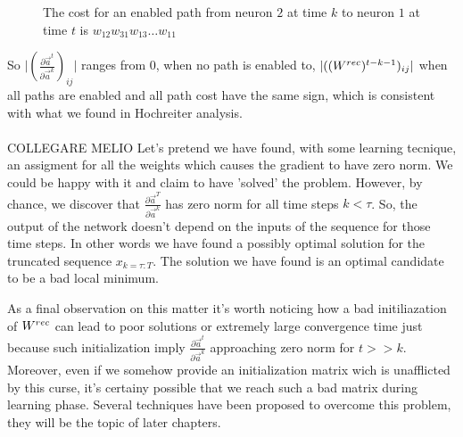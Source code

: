 \begin{figure}
\caption{The cost for an enabled path from neuron $2$ at time $k$ to neuron $1$ at time $t$ is $w_{12}w_{31}w_{13}\hdots w_{11}$ }
\label{gradient_path_cost_relu}
\end{figure}

So $\vert (\frac{\partial \vec{a}^t}{\partial \vec{a}^k})_{ij}\vert$ ranges from 0, when no path is enabled to, $\vert ((W^{rec})^{t-k-1})_{ij} \vert$ when all
paths are enabled and all path cost have the same sign, which is consistent with what we found in Hochreiter analysis.
\\\\
COLLEGARE MELIO
Let's pretend we have found, with some learning tecnique, an assigment for all the weights which causes the gradient to have zero norm. We could be happy with
it and claim to have 'solved' the problem. However, by chance, we discover that $\frac{\partial \vec{a}^T}{\partial \vec{a}^k}$ has zero norm for all
time steps $k<\tau$. So, the output of the network doesn't depend on the inputs of the sequence for those time steps.
In other words we have found a possibly optimal solution for the truncated sequence ${x}_{k=\tau:T}$. The solution we have found is an optimal candidate to
be a bad local minimum.

As a final observation on this matter it's worth noticing how a bad initiliazation of $W^{rec}$ can lead to poor solutions or extremely large convergence time
just because such initialization imply $\frac{\partial \vec{a}^t}{\partial \vec{a}^k}$ approaching zero norm for $t>>k$. Moreover, even if we somehow provide
an initialization matrix wich is unafflicted by this curse, it's certainy possible that we reach such a bad matrix during learning phase.
Several techniques have been proposed to overcome this problem, they will be the topic of later chapters.






